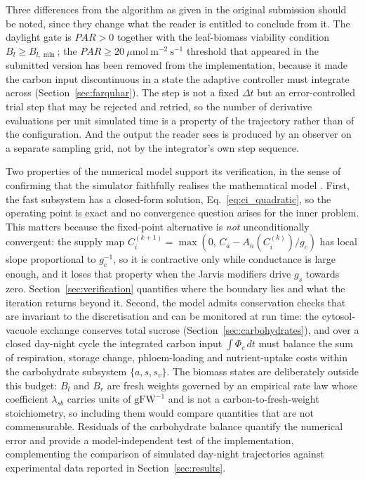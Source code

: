\documentclass[a4paper,fleqn]{cas-sc}
\begin{document}
Three differences from the algorithm as given in the original submission
should be noted, since they change what the reader is entitled to conclude
from it. The daylight gate is $\mathit{PAR}>0$ together with the leaf-biomass
viability condition $B_l \ge B_{l,\min}$; the $\mathit{PAR} \ge
20\ \mu\mathrm{mol\ m^{-2}\ s^{-1}}$ threshold that appeared in the submitted
version has been removed from the implementation, because it made the carbon
input discontinuous in a state the adaptive controller must integrate across
(Section~\ref{sec:farquhar}). The step is not a fixed $\Delta t$ but an
error-controlled trial step that may be rejected and retried, so the number of
derivative evaluations per unit simulated time is a property of the trajectory
rather than of the configuration. And the output the reader sees is produced by
an observer on a separate sampling grid, not by the integrator's own step
sequence.

Two properties of the numerical model support its verification, in the
sense of confirming that the simulator faithfully realises the mathematical
model \citep{Zeigler2000}. First, the fast subsystem has a closed-form
solution, Eq.~\eqref{eq:ci_quadratic}, so the operating point is exact and
no convergence question arises for the inner problem. This matters because
the fixed-point alternative is \emph{not} unconditionally convergent: the
supply map $C_i^{(k+1)}=\max(0,\,C_a-A_n(C_i^{(k)})/g_c)$ has local slope
proportional to $g_c^{-1}$, so it is contractive only while conductance is
large enough, and it loses that property when the Jarvis modifiers drive
$g_s$ towards zero. Section~\ref{sec:verification} quantifies where the
boundary lies and what the iteration returns beyond it. Second, the model
admits conservation checks that are invariant to the discretisation and can
be monitored at run time: the cytosol-vacuole exchange conserves total
sucrose (Section~\ref{sec:carbohydrates}), and over a closed day-night cycle
the integrated carbon input $\int \Phi_c\,dt$ must balance the sum of
respiration, storage change, phloem-loading and nutrient-uptake costs within
the carbohydrate subsystem $\{a,s,s_v\}$. The biomass states are
deliberately outside this budget: $B_l$ and $B_r$ are fresh weights governed
by an empirical rate law whose coefficient $\lambda_{sb}$ carries units of
$\mathrm{gFW^{-1}}$ and is not a carbon-to-fresh-weight stoichiometry, so
including them would compare quantities that are not commensurable.
Residuals of the carbohydrate balance quantify the numerical error and
provide a model-independent test of the implementation, complementing the
comparison of simulated day-night trajectories against experimental data
reported in Section~\ref{sec:results}.
\end{document}

